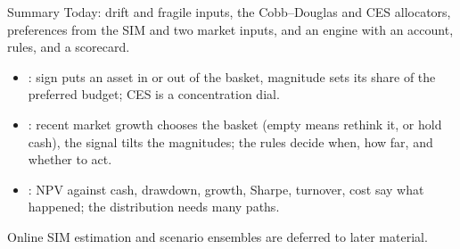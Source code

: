 \documentclass[aspectratio=169,11pt]{beamer}
\begin{document}
\begin{frame}{Summary}
  Today: drift and fragile inputs, the Cobb--Douglas and CES allocators,
  preferences from the SIM and two market inputs, and an engine with an account,
  rules, and a scorecard.

  {\large\textbf{}}
  \begin{itemize}\setlength{\itemsep}{0.1em}
    \item {}: sign puts an asset in or out of the basket,
      magnitude sets its share of the preferred budget; CES is a concentration dial.
    \item {}: recent market growth chooses the basket (empty
      means rethink it, or hold cash), the signal tilts the magnitudes; the rules
      decide when, how far, and whether to act.
    \item {}: NPV against cash,
      drawdown, growth, Sharpe, turnover, cost say what happened; the distribution
      needs many paths.
  \end{itemize}
  Online SIM estimation and scenario ensembles are deferred to later material.
\end{frame}

\end{document}
